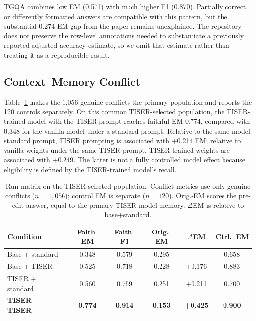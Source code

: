 \documentclass[conference]{IEEEtran}
\begin{document}
TGQA combines low EM (0.571) with much higher F1 (0.870). Partially correct or differently formatted answers are compatible with this pattern, but the substantial 0.274 EM gap from the paper remains unexplained. The repository does not preserve the row-level annotations needed to substantiate a previously reported adjusted-accuracy estimate, so we omit that estimate rather than treating it as a reproducible result.

\subsection{Context--Memory Conflict}

Table~\ref{tab:conflict} makes the 1,056 genuine conflicts the primary population and reports the 120 controls separately. On this common TISER-selected population, the TISER-trained model with the TISER prompt reaches faithful-EM 0.774, compared with 0.348 for the vanilla model under a standard prompt. Relative to the same-model standard prompt, TISER prompting is associated with +0.214 EM; relative to vanilla weights under the same TISER prompt, TISER-trained weights are associated with +0.249. The latter is not a fully controlled model effect because eligibility is defined by the TISER-trained model's recall.

\begin{table}[t]
\centering
\caption{Run matrix on the TISER-selected population. Conflict metrics use only genuine conflicts ($n=1{,}056$); control EM is separate ($n=120$). Orig.-EM scores the pre-edit answer, equal to the primary TISER-model memory. $\Delta$EM is relative to base+standard.}
\label{tab:conflict}
\setlength{\tabcolsep}{1.4pt}
{\footnotesize
\begin{tabular}{lccccc}
\toprule
\textbf{Condition} & \textbf{Faith-EM} & \textbf{Faith-F1} & \textbf{Orig.-EM} & \textbf{$\Delta$EM} & \textbf{Ctrl.\ EM} \\
\midrule
Base + standard & 0.348 & 0.579 & 0.295 & --     & 0.658 \\
Base + TISER    & 0.525 & 0.718 & 0.228 & +0.176 & 0.883 \\
TISER + standard & 0.560 & 0.759 & 0.251 & +0.211 & 0.700 \\
\rowcolor{gray!18}
\textbf{TISER + TISER} & \textbf{0.774} & \textbf{0.914} & \textbf{0.153} & \textbf{+0.425} & \textbf{0.900} \\
\bottomrule
\end{tabular}
}
\end{table}
\end{document}
